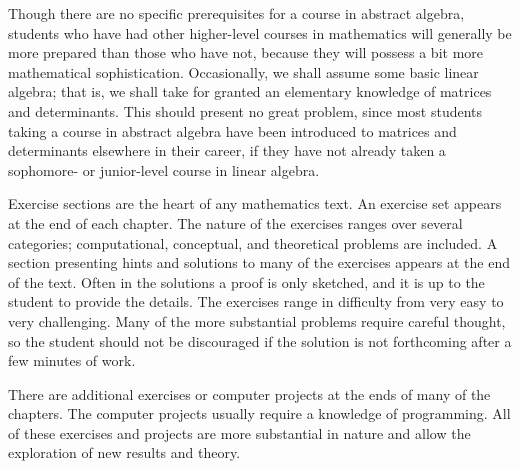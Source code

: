 \begin{figure}[htb]
\begin{center}

\end{center}
\end{figure}

Though there are no specific prerequisites for a course in abstract
algebra, students who have had other higher-level courses in
mathematics will generally be more prepared than those who have not,
because they will possess a bit more mathematical sophistication.
Occasionally, we shall assume some basic linear algebra; that is, we
shall take for granted an elementary knowledge of matrices and
determinants. This should present no great problem, since most
students taking a course in abstract algebra have been introduced to
matrices and determinants elsewhere in their career, if they have not
already taken a sophomore- or junior-level course in linear algebra.

Exercise sections are the heart of any mathematics text. An exercise
set appears at the end of each chapter. The nature of the exercises
ranges over several categories; computational,  conceptual, and
theoretical problems are included. A section presenting hints and
solutions to many of the exercises appears at the end of the text.
Often in the solutions a proof is only sketched, and it is up to the
student to provide the details. The exercises range in difficulty from
very easy to very challenging. Many of the more substantial problems
require careful thought, so the student should not be discouraged if
the solution is not forthcoming after a few minutes of work. 

There are additional exercises or computer projects at the ends of
many of the chapters. The computer projects usually require a
knowledge of programming. All of these exercises and projects are more
substantial in nature and allow the exploration of new results and
theory.

